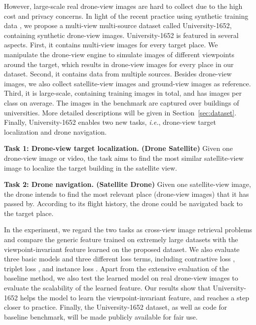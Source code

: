 \documentclass[sigconf]{acmart}
\def\ie{\emph{i.e.}}
\begin{document}
However, large-scale real drone-view images are hard to collect due to the high cost and privacy concerns. In light of the recent practice using synthetic training data  \cite{Richter_2016_ECCV,liu2018pose,wu2018dcan,li2020metaparsing}, we propose a multi-view multi-source dataset called University-1652, containing synthetic drone-view images. University-1652 is featured in several aspects. First, it contains multi-view images for every target place. We manipulate the drone-view engine to simulate images of different viewpoints around the target, which results in  drone-view images for every place in our dataset. 
Second, it contains data from multiple sources. Besides drone-view images, we also collect satellite-view images and ground-view images as reference. 
Third, it is large-scale, containing  training images in total, and has  images per class on average. The images in the benchmark are captured over  buildings  of  universities. More detailed descriptions will be given in Section~\ref{sec:dataset}.
Finally, University-1652 enables two new tasks, \ie, drone-view target localization and drone navigation. 

\noindent\textbf{Task 1: Drone-view target localization. (Drone  Satellite)} Given one drone-view image or video, the task aims to find the most similar satellite-view image to localize the target building in the satellite view. 

\noindent\textbf{Task 2: Drone navigation. (Satellite  Drone)}  Given one satellite-view image, the drone intends to find the most relevant place (drone-view images) that it has passed by. According to its flight history, the drone could be navigated back to the target place.

In the experiment, we regard the two tasks as cross-view image retrieval problems and compare the generic feature trained on extremely large datasets with the viewpoint-invariant feature learned on the proposed dataset. We also evaluate three basic models and three different loss terms, including contrastive loss \cite{lin2015learning,workman2015wide,zheng2016discriminatively}, triplet loss \cite{chechik2010large,deng2018triplet}, and instance loss \cite{zheng2017dual}. Apart from the extensive evaluation of the baseline method, we also test the learned model on real drone-view images to evaluate the scalability of the learned feature. Our results show that University-1652 helps the model to learn the viewpoint-invariant feature, and reaches a step closer to practice. Finally, the University-1652 dataset, as well as code for baseline benchmark, will be made publicly available for fair use.
\end{document}

